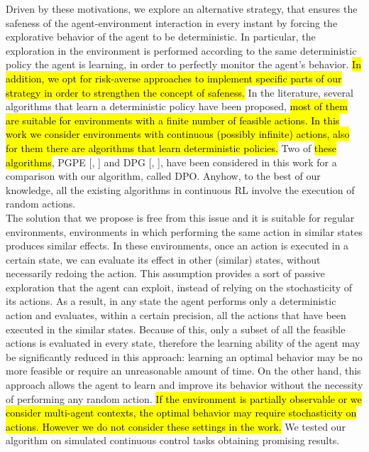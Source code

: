 Driven by these motivations, we explore an alternative strategy, that ensures the safeness of the agent-environment interaction in every instant by forcing the explorative behavior of the agent to be deterministic. In particular, the exploration in the environment is performed according to the same deterministic policy the agent is learning, in order to perfectly monitor the agent's behavior. \hl{In addition, we opt for risk-averse approaches to implement specific parts of our strategy in order to strengthen the concept of safeness.} In the literature, several algorithms that learn a deterministic policy have been proposed, \hl{most of them are suitable for environments with a finite number of feasible actions. In this work we consider environments with continuous (possibly infinite) actions, also for them there are algorithms that learn deterministic policies.} Two of \hl{these algorithms}, \acf{PGPE} [\citet{sehnke2008PolicyGradient}, ] and \acf{DPG} [\citet{article}, ], have been considered in this work for a comparison with our algorithm, called \acf{DPO}. Anyhow, to the best of our knowledge, all the existing algorithms in continuous \ac{RL} involve the execution of random actions.\\
\newline
The solution that we propose is free from this issue and it is suitable for regular environments, \ie environments in which performing the same action in similar states produces similar effects. In these environments, once an action is executed in a certain state, we can evaluate its effect in other (similar) states, without necessarily redoing the action. This assumption provides a sort of passive exploration that the agent can exploit, instead of relying on the stochasticity of its actions. As a result, in any state the agent performs only a deterministic action and evaluates, within a certain precision, all the actions that have been executed in the similar states. Because of this, only a subset of all the feasible actions is evaluated in every state, therefore the learning ability of the agent may be significantly reduced in this approach: learning an optimal behavior may be no more feasible or require an unreasonable amount of time. On the other hand, this approach allows the agent to learn and improve its behavior without the necessity of performing any random action. \hl{If the environment is partially observable or we consider multi-agent contexts, the optimal behavior may require stochasticity on actions. However we do not consider these settings in the work.} We tested our algorithm on simulated continuous control tasks obtaining promising results.\\
